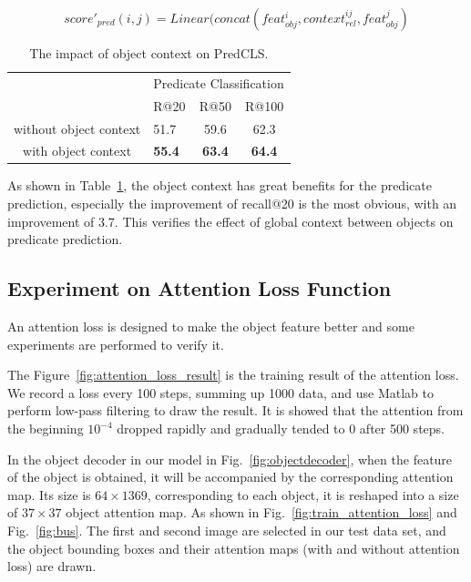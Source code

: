 \begin{equation}
	score'_{pred}(i,j) = Linear(concat(feat_{obj}^i, context_{rel}^{ij}, feat_{obj}^j)
	\label{equ:predicatd}
\end{equation}

\begin{table}[]
	\centering
	\begin{tabular}{c|lcc}
		\hline
		\multirow{2}{*}{}      & \multicolumn{3}{l}{Predicate Classification}  \\ \cline{2-4} 
		& R@20          & R@50          & R@100         \\ \hline
		without object context & 51.7          & 59.6          & 62.3          \\
		with object context    & \textbf{55.4} & \textbf{63.4} & \textbf{64.4} \\ \hline
	\end{tabular}
\caption[The impact of object context on PredCLS]{The impact of object context on PredCLS.}
\label{tab:object context}
\end{table}
As shown in Table~\ref{tab:object context}, the object context has great benefits for the predicate prediction, especially the improvement of recall@20 is the most obvious, with an improvement of 3.7. This verifies the effect of global context between objects on predicate prediction.%

\subsection{Experiment on Attention  Loss Function}

An attention loss is designed to make the object feature better and some experiments are performed to verify it.

The Figure~\ref{fig:attention_loss_result} is the training result of the attention loss. We record a loss every 100 steps, summing up 1000 data, and use Matlab to perform low-pass filtering to draw the result. It is showed that the attention from the beginning $ 10^{-4} $ dropped rapidly and gradually tended to 0 after 500 steps.

In the object decoder in our model in Fig.~\ref{fig:objectdecoder}, when the feature of the object is obtained, it will be accompanied by the corresponding attention map. Its size is $ 64\times1369 $, corresponding to each object, it is reshaped into a size of $ 37\times37 $ object attention map. As shown in Fig.~\ref{fig:train_attention_loss} and Fig.~\ref{fig:bus}. The first and second image are selected in our test data set, and the object bounding boxes and their attention maps (with and without attention loss) are drawn.

